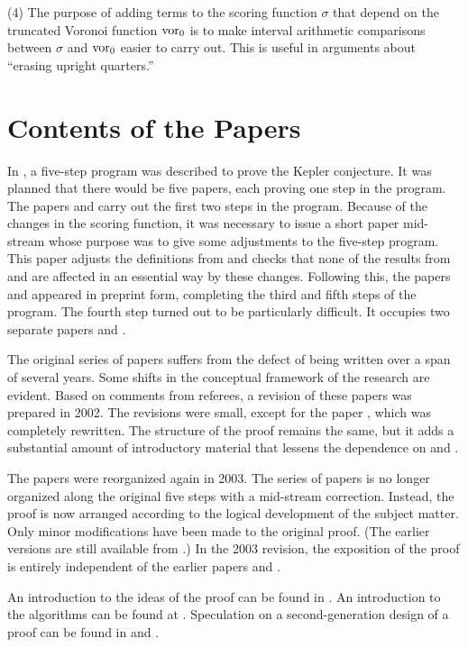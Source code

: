 (4) The purpose of adding terms to the scoring function $\sigma$
that depend on the truncated Voronoi function $\operatorname{vor}_0$ is to make
interval arithmetic comparisons between $\sigma$ and $\operatorname{vor}_0$
easier to carry out.  This is useful in arguments about ``erasing
upright quarters.''

\section{Contents of the Papers}

In \cite{Hal97A}, a five-step program was described to prove the
Kepler conjecture.  It was planned that there would be five papers,
each proving one step in the program.  The papers \cite{Hal97A} and
\cite{Hal97B} carry out the first two steps in the program. Because
of the changes in the scoring function, it was necessary to issue a
short paper \cite{Form} mid-stream whose purpose was to give some
adjustments to the five-step program. This paper adjusts the
definitions from \cite{Hal97A} and checks that none of the results
from \cite{Hal97A} and \cite{Hal97B} are affected in an essential
way by these changes. Following this, the papers \cite{Hal98B} and
\cite{Fer97} appeared in preprint form, completing the third and
fifth steps of the program. The fourth step turned out to be
particularly difficult. It occupies two separate papers
\cite{Hal98C} and \cite{Hal98D}.

The original series of papers suffers from the defect of being
written over a span of several years.  Some shifts in the
conceptual framework of the research are evident.   Based on
comments from referees, a revision of these papers was prepared in
2002. The revisions were small, except for the paper
\cite{Hal98D}, which was completely rewritten. The structure of
the proof remains the same, but it adds a substantial amount of
introductory material that lessens the dependence on \cite{Hal97A}
and \cite{Hal97B}.

The papers were reorganized again in 2003.  The series of papers
is no longer organized along the original five steps with a
mid-stream correction.  Instead, the proof is now arranged
according to the logical development of the subject matter.  Only
minor modifications have been made to the original proof.  (The
earlier versions are still available from \cite{arXiv}.)  In the
2003 revision, the exposition of the proof is entirely independent
of the earlier papers \cite{Hal97A} and \cite{Hal97B}.

An introduction to the ideas of the proof can be found in
\cite{Hal00}. An introduction to the algorithms can be found at
\cite{Hal-A}. Speculation on a second-generation design of a proof
can be found in \cite{Hal-A} and \cite{Hal01}.


